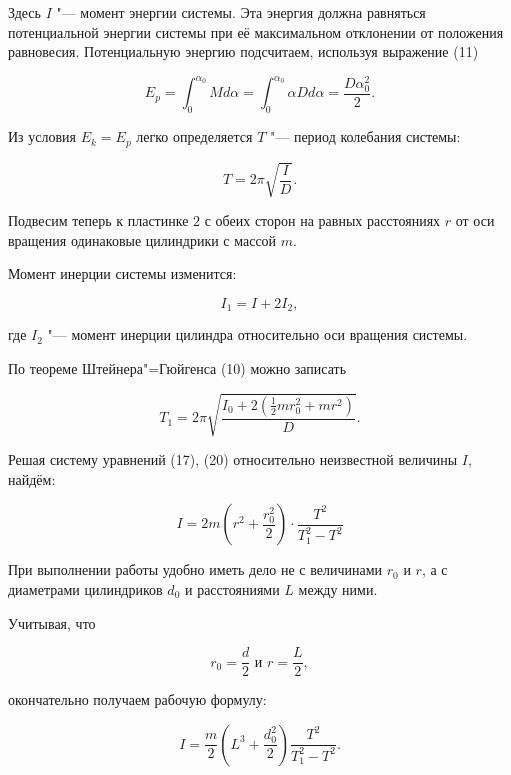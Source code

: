 Здесь $I$ "--- момент энергии системы.
Эта энергия должна равняться потенциальной энергии системы при её максимальном отклонении от положения равновесия.
Потенциальную энергию подсчитаем, используя выражение (11)

\begin{equation}
    E_p = \int_{0}^{\alpha_0} Md\alpha = \int_{0}^{\alpha_0} \alpha Dd\alpha = \frac{D\alpha_0^2}{2}.
\end{equation}

Из условия $E_k = E_p$ легко определяется $T$ "--- период колебания системы:

\begin{equation}
    T = 2\pi\sqrt{\frac{I}{D}}.
\end{equation}

Подвесим теперь к пластинке $2$ с обеих сторон на равных расстояниях $r$
от оси вращения одинаковые цилиндрики с массой $m$.

Момент инерции системы изменится:

\begin{equation}
    I_1 = I + 2I_2,
\end{equation}

где $I_2$ "--- момент инерции цилиндра относительно оси вращения системы.

По теореме Штейнера"=Гюйгенса (10) можно записать

\begin{equation}
    T_1 = 2\pi\sqrt{\frac{I_0 + 2(\frac{1}{2}mr_0^2 + mr^2)}{D}}.
\end{equation}

Решая систему уравнений (17), (20) относительно неизвестной величины $I$, найдём:

\begin{equation}
    I = 2m(r^2 + \frac{r_0^2}{2})\cdot\frac{T^2}{T_1^2 - T^2}
\end{equation}

При выполнении работы удобно иметь дело не с величинами $r_0$ и $r$, а с диаметрами цилиндриков  $d_0$ и расстояниями $L$ между ними.

Учитывая, что

\begin{equation}
    r_0 = \frac{d}{2}
    \text{ и } 
    r = \frac{L}{2},
\end{equation}

окончательно получаем рабочую формулу:

\begin{equation}
    I = \frac{m}{2}(L^3 + \frac{d_0^2}{2})\frac{T^2}{T_1^2 - T^2}.
\end{equation}